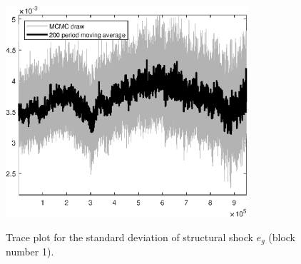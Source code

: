 \begin{figure}[H]
\centering
  \includegraphics[width=0.8\textwidth]{BRS_growth_util_sectoral/graphs/TracePlot_SE_e_g_blck_1}\\
    \caption{Trace plot for the standard deviation of structural shock ${e_g}$ (block number 1).}
\end{figure}
